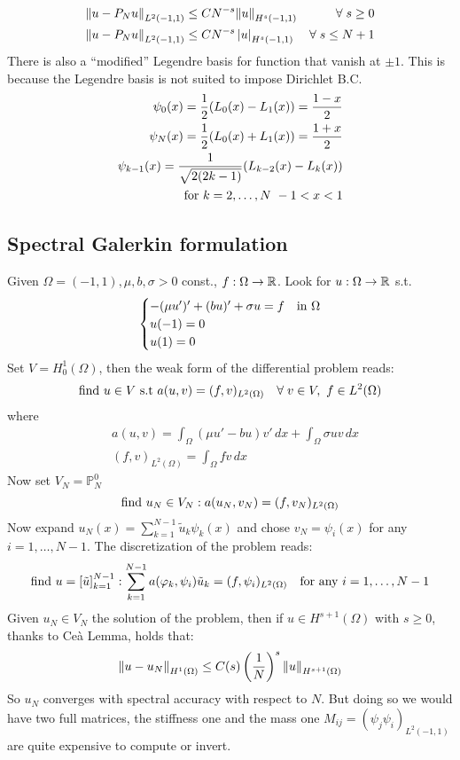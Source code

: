 \begin{align*}
    \norm{u-P_Nu}_{L^2(-1,1)} &\leq CN^{-s} \norm{u}_{H^s(-1,1)} & \forall \; s \geq 0 \\
    \norm{u-P_Nu}_{L^2(-1,1)} &\leq CN^{-s} \left\lvert u\right\rvert_{H^s(-1,1)} & \forall \; s \leq N+1 \\
\end{align*}
There is also a ``modified'' Legendre basis for function that vanish at \(\pm 1\). This is because the Legendre basis is not suited to impose Dirichlet B.C.
\begin{align*}
    \psi_0(x) = \frac{1}{2} (L_0(x) - L_1(x)) = \frac{1-x}{2} \\ 
    \psi_N(x) = \frac{1}{2} (L_0(x) + L_1(x)) = \frac{1+x}{2} \\ 
    \psi_{k-1}(x) = \frac{1}{\sqrt{2(2k-1)}} (L_{k-2}(x) - L_k(x))\\ 
    \text{for } k = 2, \ldots, N \ -1 < x < 1 \\ 
\end{align*}

\subsection{Spectral Galerkin formulation}
Given \(\Omega = (-1, 1), \mu, b, \sigma > 0\) const., \(f: \Omega \to \mathbb{R}\). Look for \(u:\Omega \to \mathbb{R}\) s.t. 
\[
    \begin{cases}
        -(\mu u')'+(bu)' + \sigma u = f & \text{in } \Omega \\
        u(-1) = 0 \\
        u(1) = 0
    \end{cases}
\]
Set \(V  = H^1_0(\Omega)\), then the weak form of the differential problem reads: 
\[
    \text{find } u \in V \text{ s.t } a(u,v) = (f,v)_{L^2(\Omega)} \quad \forall \; v \in V, \ f \in L^2(\Omega)
\]
where 
\begin{align*}
    & a(u,v) = \int_{\Omega} (\mu u' - bu)v'\, dx + \int_{\Omega} \sigma uv \, dx \\
    & (f,v)_{L^2(\Omega)} = \int_{\Omega} f v \, dx
\end{align*}
Now set \(V_N = \mathbb{P}^0_N\) 
\begin{equation}
    \text{find } u_N \in V_N: a(u_N, v_N) = (f, v_N)_{L^2(\Omega)} \label{weak_spec_galerkin_formulation}
\end{equation}
Now expand \(u_N(x) = \sum_{k=1}^{N-1} \tilde{u}_k \psi_k(x)\) and chose \(v_N = \psi_i(x)\) for any \(i = 1, \ldots, N-1\).
The discretization of the problem reads:
\[
    \text{find } u = \left[\tilde{u}\right]_{k=1}^{N-1} : \sum_{k=1}^{N-1} a(\varphi_k, \psi_i)\tilde{u}_k = (f, \psi_i)_{L^2(\Omega)} \quad \text{for any } i = 1, \ldots, N-1
\]
Given \(u_N \in V_N\) the solution of the problem, then if \(u \in H^{s+1}(\Omega)\) with \(s \geq 0\), thanks to Ceà Lemma, holds that:
\[
    \norm{u-u_N}_{H^1(\Omega)} \leq C(s)\left(\frac{1}{N}\right)^s\norm{u}_{H^{s+1}(\Omega)}
\]
So \(u_N\) converges with spectral accuracy with respect to \(N\).
But doing so we would have two full matrices, the stiffness one and the mass one  \(M_{ij} = (\psi_j \psi_i)_{L^2(-1,1)}\) are quite expensive to compute or invert.


